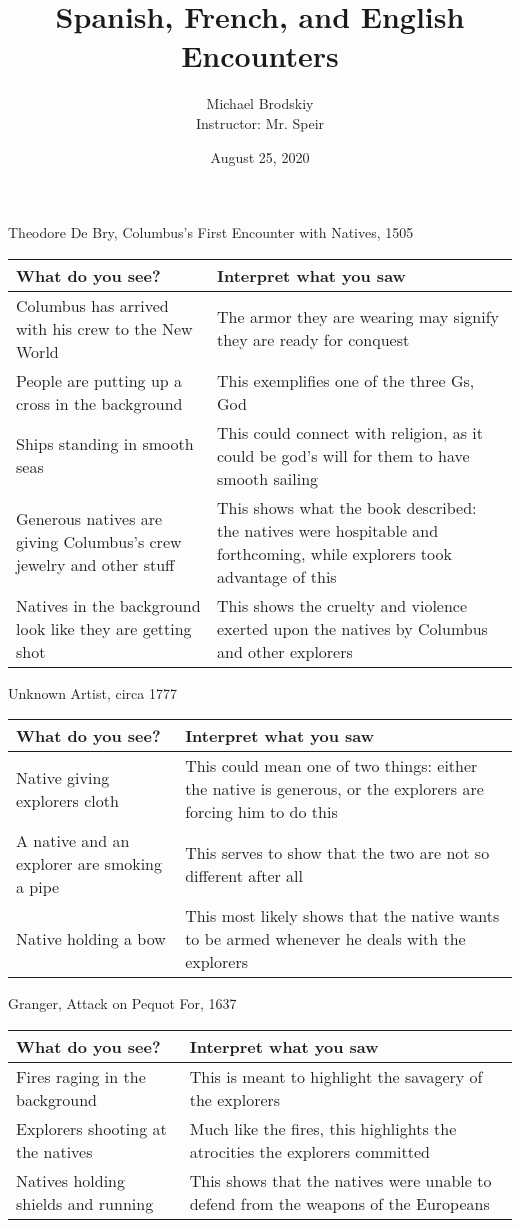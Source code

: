\documentclass[12pt]{article}
\title{Spanish, French, and English Encounters}
\date{August 25, 2020}
\author{Michael Brodskiy\\ \small Instructor: Mr. Speir}
\begin{document}
\maketitle
\begin{center}
  Theodore De Bry, Columbus's First Encounter with Natives, 1505
\begin{tabular}{|p{}|p{}|}
\hline
What do you see? & Interpret what you saw \\
\hline
Columbus has arrived with his crew to the New World & The armor they are wearing may signify they are ready for conquest \\
People are putting up a cross in the background & This exemplifies one of the three Gs, God \\
Ships standing in smooth seas & This could connect with religion, as it could be god's will for them to have smooth sailing \\
Generous natives are giving Columbus's crew jewelry and other stuff & This shows what the book described: the natives were hospitable and forthcoming, while explorers took advantage of this\\
Natives in the background look like they are getting shot & This shows the cruelty and violence exerted upon the natives by Columbus and other explorers \\
\hline


\end{tabular}

\newpage

Unknown Artist, circa 1777
\begin{tabular}{|p{}|p{}|}
\hline
What do you see? & Interpret what you saw \\
\hline
Native giving explorers cloth & This could mean one of two things: either the native is generous, or the explorers are forcing him to do this \\
A native and an explorer are smoking a pipe & This serves to show that the two are not so different after all \\
Native holding a bow & This most likely shows that the native wants to be armed whenever he deals with the explorers\\
\hline


\end{tabular}
\newpage
Granger, Attack on Pequot For, 1637
\begin{tabular}{|p{}|p{}|}
\hline
What do you see? & Interpret what you saw \\
\hline
Fires raging in the background & This is meant to highlight the savagery of the explorers\\
Explorers shooting at the natives & Much like the fires, this highlights the atrocities the explorers committed \\
Natives holding shields and running & This shows that the natives were unable to defend from the weapons of the Europeans \\
\hline


\end{tabular}
\end{center}
\end{document}
